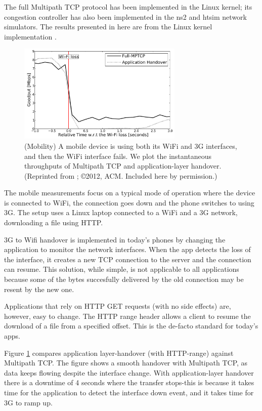 The full Multipath TCP protocol has been implemented in the Linux
kernel; its congestion controller has also been implemented in the ns2
and htsim network simulators. The results presented in here are from
the Linux kernel implementation \cite{raiciu2012hard}. 

\begin{figure}[t]
\centering
\includegraphics[width=0.7\textwidth]{figures/figure2}
\caption{(Mobility) A mobile device is using both its WiFi and 3G interfaces, and then the WiFi
interface fails. We plot the instantaneous throughputs of Multipath TCP and application-layer
handover. (Reprinted from \cite{Paasch_Mobile:2012}; \copyright 2012,
ACM. Included here by permission.)} 
\label{fig:mptcp2}
\end{figure}

The mobile measurements focus on a typical mode of operation where the device is 
connected to WiFi, the connection goes down and the phone switches to using 3G. 
The setup uses a Linux laptop connected to a WiFi and a 3G network, downloading a 
file using HTTP. 

3G to Wifi handover is implemented in today's phones by changing the application to monitor
the network interfaces. When the app detects the loss of the interface, it creates a new TCP connection 
to the server and the connection can resume. This solution, while simple, is not applicable to all applications
because some of the bytes succesfully delivered by the old connection may be resent by the new one.

Applications that rely on HTTP GET requests (with no side effects) are, however, easy to change. The 
HTTP range header allows a client to resume the download of a file from a specified offset. This is the de-facto
standard for today's apps.  

Figure \ref{fig:mptcp2} compares application layer-handover (with HTTP-range) against Multipath TCP.
The figure shows a 
smooth handover with Multipath TCP, as data keeps flowing despite the interface 
change. With application-layer handover there is a downtime of 4 seconds where the transfer 
stops-this is because it takes time for the application to detect the interface down 
event, and it takes time for 3G to ramp up. 

